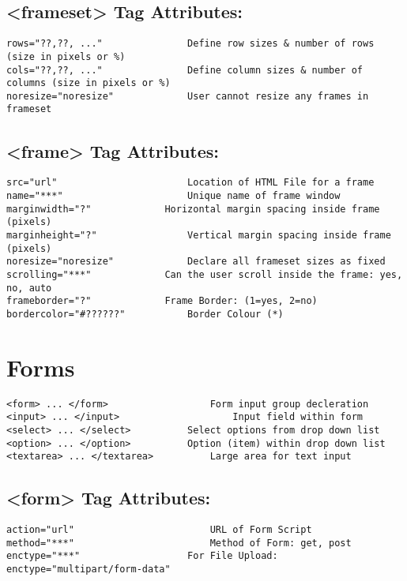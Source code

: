 \documentclass[11pt]{article}
\begin{document}
\subsection*{<frameset> Tag Attributes:}
\label{sec:org6444e01}
\begin{verbatim}
rows="??,??, ..."		        Define row sizes & number of rows (size in pixels or %)
cols="??,??, ..."		        Define column sizes & number of columns (size in pixels or %)
noresize="noresize"		        User cannot resize any frames in frameset
\end{verbatim}
\subsection*{<frame> Tag Attributes:}
\label{sec:org4c43c2b}
\begin{verbatim}
src="url"		                Location of HTML File for a frame
name="***"		                Unique name of frame window
marginwidth="?"		        Horizontal margin spacing inside frame (pixels)
marginheight="?"		        Vertical margin spacing inside frame (pixels)
noresize="noresize"		        Declare all frameset sizes as fixed
scrolling="***"		        Can the user scroll inside the frame: yes, no, auto
frameborder="?"		        Frame Border: (1=yes, 2=no)
bordercolor="#??????"	        Border Colour (*)
\end{verbatim}
\section*{Forms}
\label{sec:orgc1e388c}
\begin{verbatim}
<form> ... </form>	                Form input group decleration
<input> ... </input>	                Input field within form
<select> ... </select>	        Select options from drop down list
<option> ... </option>	        Option (item) within drop down list
<textarea> ... </textarea>	        Large area for text input
\end{verbatim}

\subsection*{<form> Tag Attributes:}
\label{sec:org6416c21}
\begin{verbatim}
action="url"		                URL of Form Script
method="***"		                Method of Form: get, post
enctype="***"	                For File Upload: enctype="multipart/form-data"
\end{verbatim}
\end{document}
